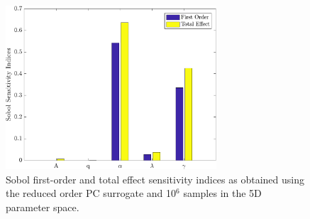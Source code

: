 \clearpage


\begin{figure}[p]
 \begin{center}
  \includegraphics[width=0.70\textwidth]{./Figures/PCE5D_gsa}
\caption{Sobol first-order and total effect sensitivity indices as obtained using the reduced order PC
surrogate and 10$^{6}$ samples in the 5D parameter space. }
\label{fig:gsa}
\end{center}
\end{figure}

\clearpage


